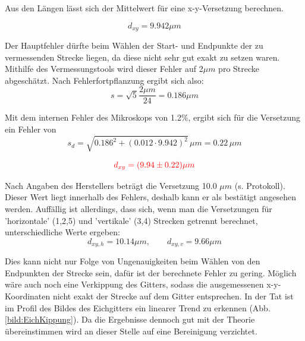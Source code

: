 Aus den Längen lässt sich der Mittelwert für eine x-y-Versetzung berechnen.

\begin{equation*}
    d_{xy} = 9.942 \mu m
\end{equation*}

Der Hauptfehler dürfte beim Wählen der Start- und Endpunkte 
der zu vermessenden Strecke liegen, da diese nicht sehr gut exakt zu setzen waren. Mithilfe des Vermessungstools wird dieser Fehler auf 
2$\mu m$ pro Strecke abgeschätzt. Nach Fehlerfortpflanzung ergibt sich also:
\begin{equation*}
    s = \sqrt{5}\frac{2 \mu m}{24} = 0.186 \mu m
\end{equation*}

Mit dem internen Fehler des Mikroskops von 1.2\%, ergibt sich für die Versetzung ein Fehler von
\begin{equation*}
    s_d = \sqrt{0.186^2 + (0.012 \cdot 9.942)^2}\, \mu m = 0.22\, \mu m
\end{equation*}

\begin{equation*}
    \textcolor{red}{d_{xy} = (9.94 \pm 0.22) \mu m}
\end{equation*}

Nach Angaben des Herstellers beträgt die Versetzung 10.0 $\mu m$ (s. Protokoll). 
Dieser Wert liegt innerhalb des Fehlers, deshalb kann er als bestätigt angesehen werden. Auffällig ist allerdings, dass sich, 
wenn man die Versetzungen für 'horizontale' (1,2,5) und 'vertikale' (3,4) Strecken getrennt berechnet, unterschiedliche Werte ergeben: 
\begin{equation*}
    d_{xy,h} = 10.14 \mu m, \qquad d_{xy,v} = 9.66 \mu m
\end{equation*}

Dies kann nicht nur Folge von Ungenauigkeiten beim Wählen von den Endpunkten der Strecke sein, dafür ist der berechnete Fehler zu gering. 
Möglich wäre auch noch eine Verkippung des Gitters, sodass die ausgemessenen x-y-Koordinaten nicht exakt der Strecke auf dem Gitter 
entsprechen. In der Tat ist im Profil des Bildes des Eichgitters ein linearer Trend zu erkennen (Abb. \ref{bild:EichKippung}). 
Da die Ergebnisse dennoch gut mit der Theorie übereinstimmen wird an dieser Stelle auf eine Bereinigung verzichtet.

